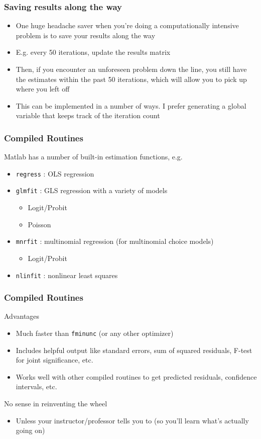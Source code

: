 \documentclass[english,xcolor=dvipsnames]{beamer}
\newcommand{\bi}{\begin{itemize}}
\newcommand{\ei}{\end{itemize}}
\begin{document}
\begin{frame}
\frametitle{Saving results along the way}
   \bi 
   \item One huge headache saver when you're doing a computationally intensive problem is to save your results along the way
   \item E.g. every 50 iterations, update the results matrix
   \item Then, if you encounter an unforeseen problem down the line, you still have the estimates within the past 50 iterations, which will allow you to pick up where you left off
   \item This can be implemented in a number of ways. I prefer generating a global variable that keeps track of the iteration count
   \ei
\end{frame}

\begin{frame}
\frametitle{Compiled Routines}
Matlab has a number of built-in estimation functions, e.g.
      \bi 
      \item \texttt{regress} : OLS regression
      \item \texttt{glmfit} : GLS regression with a variety of models
         \bi 
         \item Logit/Probit
         \item Poisson
         \ei
      \item \texttt{mnrfit} : multinomial regression (for multinomial choice models)
         \bi 
         \item Logit/Probit
         \ei
      \item \texttt{nlinfit} : nonlinear least squares
      \ei
\end{frame}

\begin{frame}
\frametitle{Compiled Routines}
Advantages
      \bi 
      \item Much faster than \texttt{fminunc} (or any other optimizer)
      \item Includes helpful output like standard errors, sum of squared residuals, F-test for joint significance, etc.
      \item Works well with other compiled routines to get predicted residuals, confidence intervals, etc.
      \ei
No sense in reinventing the wheel
      \bi 
      \item Unless your instructor/professor tells you to (so you'll learn what's actually going on)
      \ei
\end{frame}
\end{document}
